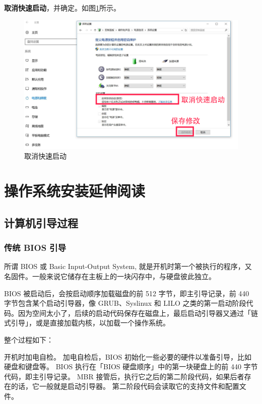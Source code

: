 \documentclass[doctor,openright,twoside]{sjtuthesis}
\newcommand\setdefaultfigure{\floatplacement{figure}{htp}}
\theoremstyle{plain}
\theoremstyle{definition}
\theoremstyle{remark}
\theoremstyle{ocrenumbox}
\theoremstyle{plain}
\begin{document}
\textbf{取消快速启动}，并确定。如图\ref{win10-qidong-05}所示。

\begin{figure}
\centering
\includegraphics{images/win10-qidong-05.png}
\caption{取消快速启动\label{win10-qidong-05}}
\end{figure}

\setdefaultfigure

\hypertarget{install-further-read}{%
\chapter{操作系统安装延伸阅读}\label{install-further-read}}

\section{计算机引导过程}

\hypertarget{-bios-}{%
\subsection{传统 BIOS 引导}\label{-bios-}}

所谓 BIOS 或 Basic Input-Output System,
就是开机时第一个被执行的程序，又名固件。一般来说它储存在主板上的一块闪存中，与硬盘彼此独立。

BIOS 被启动后，会按启动顺序加载磁盘的前 512 字节，即主引导记录，前 440
字节包含某个启动引导器，像 GRUB、Syslinux 和 LILO
之类的第一启动阶段代码。因为空间太小了，后续的启动代码保存在磁盘上，最后启动引导器又通过「链式引导」，或是直接加载内核，以加载一个操作系统。

整个过程如下：

开机时加电自检。 加电自检后，BIOS
初始化一些必要的硬件以准备引导，比如硬盘和键盘等。 BIOS 执行在「BIOS
硬盘顺序」中的第一块硬盘上的前 440 字节代码，即主引导记录。 MBR
接管后，执行它之后的第二阶段代码，如果后者存在的话，它一般就是启动引导器。
第二阶段代码会读取它的支持文件和配置文件。
\end{document}
